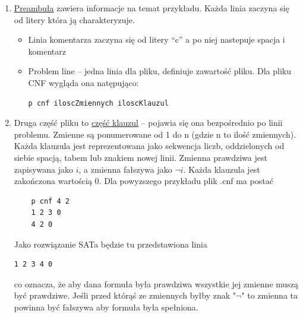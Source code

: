 \documentclass{article}
\begin{document}
\begin{enumerate}
\item \underline{Preambuła} zawiera informacje na temat przykładu. Każda linia zaczyna się od litery która ją charakteryzuje. 
\begin{itemize}
	\item Linia komentarza zaczyna się od litery “c” a po niej nastepuje spacja i komentarz
	\item 
 Problem line – jedna linia dla pliku, definiuje zawartość pliku. Dla pliku CNF wygląda ona natępująco:
\begin{lstlisting}
p cnf iloscZmiennych iloscKlauzul 
\end{lstlisting} 
\end{itemize} 
\item
Druga część pliku to \underline{część klauzul} – pojawia się ona bezpośrednio po linii problemu. Zmienne są ponumerowane od 1 do n (gdzie n to ilość zmiennych). Każda klauzula jest reprezentowana jako sekwencja liczb, oddzielonych od siebie spacją, tabem lub znakiem nowej linii. Zmienna prawdziwa jest zapisywana jako $i$,  a zmienna fałszywa jako $\neg i$. Każda klauzula jest zakończona wartością 0. 
Dla powyzszego przykładu plik .cnf ma postać
\begin{lstlisting}
	p cnf 4 2
	1 2 3 0
	4 2 0
\end{lstlisting}

Jako rozwiązanie SATa będzie tu przedstawiona linia
\begin{lstlisting}
1 2 3 4 0
\end{lstlisting}

co oznacza, że aby dana formuła była prawdziwa wszystkie jej zmienne muszą być prawdziwe.  Jeśli przed którąś ze zmiennych byłby znak "$\neg$" to zmienna ta powinna być fałszywa aby formuła była spełniona. 
\end{enumerate}
\end{document}
